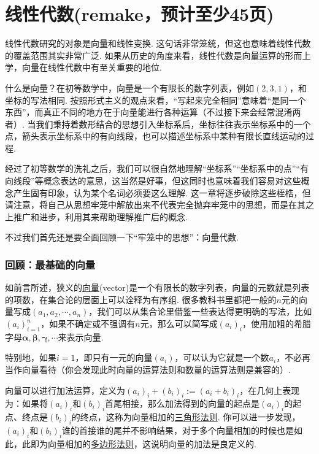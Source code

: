 \documentclass[main.tex]{subfiles}
\begin{document}
\part{线性代数(remake，预计至少45页)}

线性代数研究的对象是向量和线性变换. 这句话非常笼统，但这也意味着线性代数的覆盖范围其实非常广泛. 如果从历史的角度来看，线性代数是向量运算的形而上学，向量在线性代数中有至关重要的地位. 

什么是向量？在初等数学中，向量是一个有限长的数字列表，例如\((2,3,1)\)，和坐标的写法相同. 按照形式主义的观点来看，“写起来完全相同”意味着“是同一个东西”，而真正不同的地方在于向量能进行各种运算（不过接下来会经常混淆两者）. 当我们秉持着数形结合的思想引入坐标系后，坐标往往表示坐标系中的一个点，箭头表示坐标系中的有向线段，也可以描述坐标系中某种有限长直线运动的过程. 

经过了初等数学的洗礼之后，我们可以很自然地理解“坐标系”“坐标系中的点”“有向线段”等概念表达的意思，这当然是好事，但这同时也意味着我们容易对这些概念产生固有印象，认为某个名词必须要这么理解. 这一章将逐步破除这些桎梏，但请注意，将自己从思想牢笼中解放出来不代表完全抛弃牢笼中的思想，而是在其之上推广和进步，利用其来帮助理解推广后的概念. 

不过我们首先还是要全面回顾一下“牢笼中的思想”：向量代数.

\section{回顾：最基础的向量}

如前言所述，狭义的\uline{向量}(vector)是一个有限长的数字列表，向量的元数就是列表的项数，在集合论的层面上可以诠释为有序组. 很多教科书里都把一般的\(n\)元的向量写成\((a_1,a_2,\cdots,a_n)\)，我们可以从集合论里借鉴一些表达得更明确的写法，比如\((a_i)_{i=1}^{n}\)，如果不确定或不强调有\(n\)元，那么可以简写成\((a_i)_i\)，使用加粗的希腊字母\(\bm{\alpha},\bm{\beta},\bm{\gamma},\cdots\)来表示向量. 

特别地，如果\(i = 1\)，即只有一元的向量\((a_i)\)，可以认为它就是一个数\(a_i\)，不必再当作向量看待（你会发现此时向量的运算法则和数量的运算法则是兼容的）.

向量可以进行加法运算，定义为\((a_i)_i + (b_i)_i := (a_i + b_i)_i\)，在几何上表现为：如果将\((a_i)_i\)和\((b_i)_i\)首尾相接，那么加法得到的向量的起点是\((a_i)_i\)的起点、终点是\((b_i)_i\)的终点，这称为向量相加的\uline{三角形法则}. 你可以进一步发现，\((a_i)_i\)和\((b_i)_i\)谁的首接谁的尾并不影响结果，对于多个向量相加的时候也是如此，此即为向量相加的\uline{多边形法则}，这说明向量的加法是良定义的.
\end{document}
